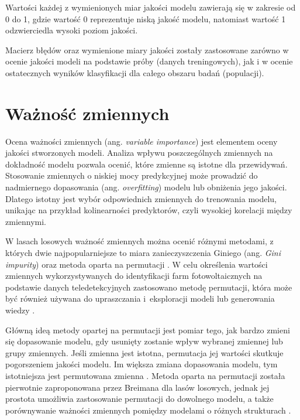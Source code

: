 \documentclass{amuthesis}
\begin{document}
Wartości każdej z wymienionych miar jakości modelu zawierają się w
zakresie od 0 do 1, gdzie wartość 0 reprezentuje niską jakość modelu,
natomiast wartość 1 odzwierciedla wysoki poziom jakości.

Macierz błędów oraz wymienione miary jakości zostały zastosowane zarówno
w ocenie jakości modeli na podstawie próby (danych treningowych), jak i
w ocenie ostatecznych wyników klasyfikacji dla całego obszaru badań
(populacji).

\hypertarget{sec-variable-importance}{%
\section{Ważność zmiennych}\label{sec-variable-importance}}

Ocena ważności zmiennych (ang. \emph{variable importance}) jest
elementem oceny jakości stworzonych modeli. Analiza wpływu
poszczególnych zmiennych na dokładność modelu pozwala ocenić, które
zmienne są istotne dla przewidywań. Stosowanie zmiennych o niskiej mocy
predykcyjnej może prowadzić do nadmiernego dopasowania (ang.
\emph{overfitting}) modelu lub obniżenia jego jakości. Dlatego istotny
jest wybór odpowiednich zmiennych do trenowania modelu, unikając na
przykład kolinearności predyktorów, czyli wysokiej korelacji między
zmiennymi.

W lasach losowych ważność zmiennych można ocenić różnymi metodami, z
których dwie najpopularniejsze to miara zanieczyszczenia Giniego (ang.
\emph{Gini impurity}) oraz metoda oparta na permutacji
\autocite{biecek_2017_przewodnik}. W celu określenia wartości zmiennych
wykorzystywanych do identyfikacji farm fotowoltaicznych na podstawie
danych teledetekcyjnych zastosowano metodę permutacji, która może być
również używana do upraszczania i~eksploracji modeli lub generowania
wiedzy \autocite{biecek_2021_model_analysis}.

Główną ideą metody opartej na permutacji jest pomiar tego, jak bardzo
zmieni się dopasowanie modelu, gdy usunięty zostanie wpływ wybranej
zmiennej lub grupy zmiennych. Jeśli zmienna jest istotna, permutacja jej
wartości skutkuje pogorszeniem jakości modelu. Im większa zmiana
dopasowania modelu, tym istotniejsza jest permutowana zmienna
\autocite{biecek_2021_model_analysis}. Metoda oparta na permutacji
została pierwotnie zaproponowana przez Breimana
\autocite*{breiman_2001_rf} dla lasów losowych, jednak jej prostota
umożliwia zastosowanie permutacji do dowolnego modelu, a także
porównywanie ważności zmiennych pomiędzy modelami o różnych strukturach
\autocite{biecek_2021_model_analysis}.
\end{document}
